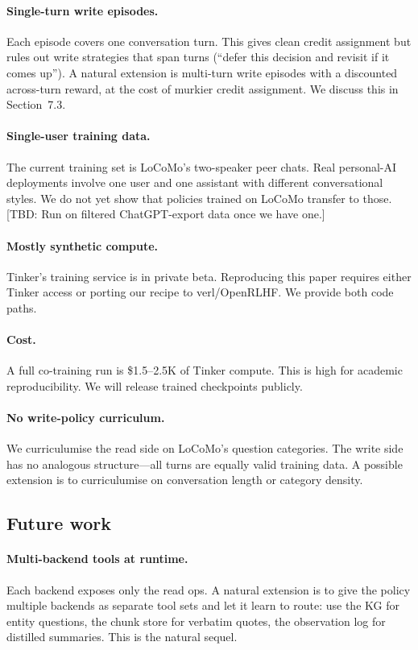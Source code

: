 \documentclass[11pt]{article}
\newcommand{\TBD}[1]{%
  \textcolor{red!80!black}{\textsf{[TBD: #1]}}}
\begin{document}
\paragraph{Single-turn write episodes.} Each episode covers one
conversation turn. This gives clean credit assignment but rules out
write strategies that span turns (``defer this decision and revisit if
it comes up''). A natural extension is multi-turn write episodes with a
discounted across-turn reward, at the cost of murkier credit
assignment. We discuss this in Section~7.3.

\paragraph{Single-user training data.} The current training set is
LoCoMo's two-speaker peer chats. Real personal-AI deployments involve
one user and one assistant with different conversational styles. We do
not yet show that policies trained on LoCoMo transfer to those.
\TBD{Run on filtered ChatGPT-export data once we have one.}

\paragraph{Mostly synthetic compute.} Tinker's training service is in
private beta. Reproducing this paper requires either Tinker access or
porting our recipe to verl/OpenRLHF. We provide both code paths.

\paragraph{Cost.} A full co-training run is \$1.5--2.5K of Tinker
compute. This is high for academic reproducibility. We will release
trained checkpoints publicly.

\paragraph{No write-policy curriculum.} We curriculumise the read side
on LoCoMo's question categories. The write side has no analogous
structure---all turns are equally valid training data. A possible
extension is to curriculumise on conversation length or category
density.

\subsection{Future work}

\paragraph{Multi-backend tools at runtime.} Each backend exposes only
the read ops. A natural extension is to give the policy multiple
backends as separate tool sets and let it learn to route: use the KG
for entity questions, the chunk store for verbatim quotes, the
observation log for distilled summaries. This is the natural sequel.
\end{document}
